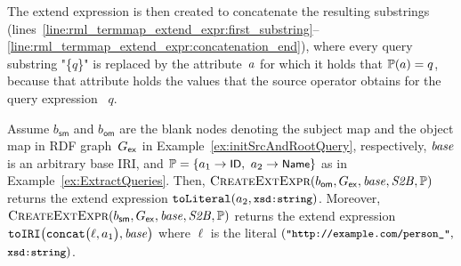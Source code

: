 %
The extend expression is then created to concatenate the
	resulting
substrings (lines~\ref{line:rml_termmap_extend_expr:first_substring}--\ref{line:rml_termmap_extend_expr:concatenation_end}), where every query substring "\{$q$\}" is replaced by the attribute~$a$ for which
	it holds that
$\mathbb{P}(a) = q$, because that attribute holds the values that the source operator obtains for the query
	expression~%
$q$.

\begin{example}
	\label{ex:rml_termmap_extend_expr}
	Assume
		$b_\mathsf{sm}$ and $b_\mathsf{om}$ are the blank nodes denoting the subject map and the object map in RDF graph~$G_\mathsf{ex}$ in
			Example~\ref{ex:initSrcAndRootQuery}, respectively,
		$\mathit{base}$ is an arbitrary base IRI,
	and
		$\mathbb{P} = \{ a_1 \rightarrow \textsf{\small ID},$ $a_2 \rightarrow \textsf{\small Name} \}$
	as in Example~\ref{ex:ExtractQueries}.
		Then,
%
	$\textsc{CreateExtExpr}(b_\mathsf{om}, G_\mathsf{ex}, \mathit{base}, \mathit{S2B}, \mathbb{P})$ returns the extend expression $\texttt{toLiteral}(a_2, \texttt{\small xsd:string})$. Moreover, $\textsc{CreateExtExpr}(b_\mathsf{sm}, G_\mathsf{ex}, \mathit{base}, \mathit{S2B}, \mathbb{P})$ returns
		the extend expression
	$
	\texttt{toIRI}\bigl(
		\texttt{concat}\bigl(
				\ell,
			a_1
		\bigr),
		\mathit{base}
	\bigr)
	$
	where $\ell$ is the literal $(\texttt{\small "http://example.com/person\_"},$ $\texttt{\small xsd:string})$.
\end{example}

